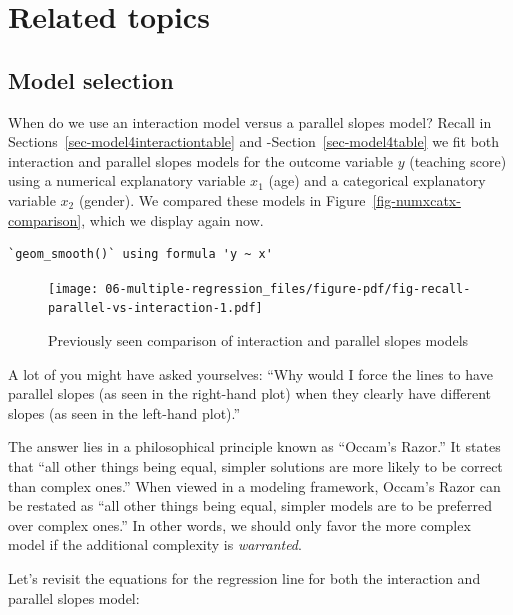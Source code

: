 \documentclass[
  letterpaper,
  DIV=11,
  numbers=noendperiod]{scrreprt}
\theoremstyle{definition}
\theoremstyle{remark}
\begin{document}
\hypertarget{related-topics-1}{%
\section{Related topics}\label{related-topics-1}}

\hypertarget{sec-model-selection}{%
\subsection{Model selection}\label{sec-model-selection}}

When do we use an interaction model versus a parallel slopes model?
Recall in Sections~\ref{sec-model4interactiontable} and
-Section~\ref{sec-model4table} we fit both interaction and parallel
slopes models for the outcome variable \(y\) (teaching score) using a
numerical explanatory variable \(x_1\) (age) and a categorical
explanatory variable \(x_2\) (gender). We compared these models in
Figure~\ref{fig-numxcatx-comparison}, which we display again now.

\begin{verbatim}
`geom_smooth()` using formula 'y ~ x'
\end{verbatim}

\begin{figure}

{\centering \texttt{[image: 06-multiple-regression\_files/figure-pdf/fig-recall-parallel-vs-interaction-1.pdf]}

}

\caption{\label{fig-recall-parallel-vs-interaction}Previously seen
comparison of interaction and parallel slopes models}

\end{figure}

A lot of you might have asked yourselves: ``Why would I force the lines
to have parallel slopes (as seen in the right-hand plot) when they
clearly have different slopes (as seen in the left-hand plot).''

The answer lies in a philosophical principle known as ``Occam's Razor.''
It states that ``all other things being equal, simpler solutions are
more likely to be correct than complex ones.'' When viewed in a modeling
framework, Occam's Razor  can be restated as ``all
other things being equal, simpler models are to be preferred over
complex ones.'' In other words, we should only favor the more complex
model if the additional complexity is \emph{warranted}.

Let's revisit the equations for the regression line for both the
interaction and parallel slopes model:
\end{document}
